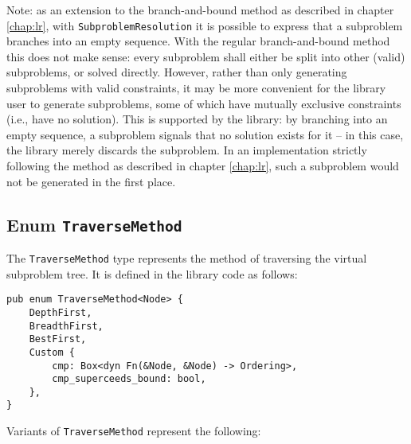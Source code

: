 Note: as an extension to the branch-and-bound method as described in chapter \ref{chap:lr},
with \texttt{SubproblemResolution} it is possible to express that a subproblem branches
into an empty sequence. With the regular branch-and-bound method this does not make sense:
every subproblem shall either be split into other (valid) subproblems, or solved directly.
However, rather than only generating subproblems with valid constraints, it may be more
convenient for the library user to generate subproblems, some of which have mutually exclusive
constraints (i.e., have no solution). This is supported by the library:
by branching into an empty sequence, a subproblem signals that no solution exists for it --
in this case, the library merely discards the subproblem. In an implementation strictly
following the method as described in chapter \ref{chap:lr}, such a subproblem would not be
generated in the first place.

\subsection{Enum \texttt{TraverseMethod}}

The \texttt{TraverseMethod} type represents the method of traversing the virtual subproblem
tree. It is defined in the library code as follows:

\begin{lstlisting}[caption=Enum \texttt{TraverseMethod}]
pub enum TraverseMethod<Node> {
    DepthFirst,
    BreadthFirst,
    BestFirst,
    Custom {
        cmp: Box<dyn Fn(&Node, &Node) -> Ordering>,
        cmp_superceeds_bound: bool,
    },
}
\end{lstlisting}

Variants of \texttt{TraverseMethod} represent the following:

